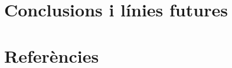 \documentclass{article}
\begin{document}
\begin{figure}[H]
\begin{figure}[H]
        \end{figure}
    \end{figure}

          
    \section{Conclusions i línies futures}
    
    \section{Referències}
\end{document}
